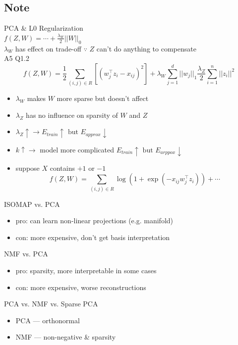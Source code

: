 \documentclass[10pt,landscape,a4paper]{article}
\begin{document}
\begin{multicols*}{5}
\subsection{Note}
PCA \& L0 Regularization \\
\(f(Z,W) = \cdots + \frac{\lambda_W}{2} ||W||_0\) \\
\(\lambda_W\) has effect on trade-off \(\because \) \(Z\) can't do anything to compensate \\
A5 Q1.2 \\
\begin{dmath*}
    f(Z,W) = \frac{1}{2} \sum_{(i,j) \in R} [(w_j^\intercal z_i-x_{ij})^2] + \lambda_W \sum_{j=1}^{d} ||w_j||_1 \frac{\lambda_Z}{2} \sum_{i=1}^{n} ||z_i||^2
\end{dmath*}
\begin{itemize}
    \item \(\lambda_W\) makes \(W\) more sparse but doesn't affect
    \item \(\lambda_Z\) has no influence on sparsity of \(W\) and \(Z\)
    \item \(\lambda_Z \uparrow \rightarrow E_{train} \uparrow \text{ but } E_{approx} \downarrow \)
    \item \(k \uparrow \rightarrow \) model more complicated \(E_{train} \uparrow \text{ but } E_{arppox} \downarrow \)
    \item suppose \(X\) contains \(+1\) or \(-1\) \\
    \begin{dmath*}
        f(Z,W) = \sum_{(i,j) \in R} \log(1+\exp(-x_{ij}w_j^\intercal z_i)) + \cdots
    \end{dmath*}
\end{itemize}
ISOMAP vs. PCA
\begin{itemize}
    \item pro: can learn non-linear projections (e.g. manifold)
    \item con: more expensive, don't get basis interpretation
\end{itemize}
NMF vs. PCA
\begin{itemize}
    \item pro: sparsity, more interpretable in some cases
    \item con: more expensive, worse reconstructions
\end{itemize}
PCA vs. NMF vs. Sparse PCA
\begin{itemize}
    \item PCA --- orthonormal
    \item NMF --- non-negative \& sparsity

\end{itemize}
\end{multicols*}
\end{document}

